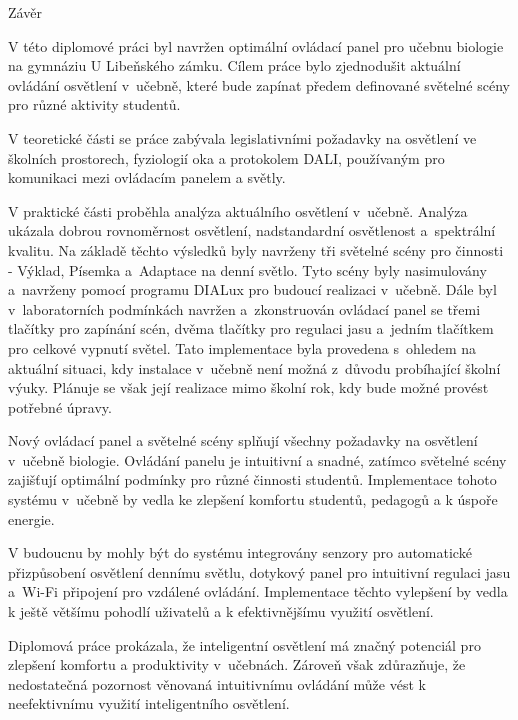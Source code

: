 \nonum\chap Závěr

V této diplomové práci byl navržen optimální ovládací panel pro učebnu
biologie na gymnáziu U Libeňského zámku.
Cílem práce bylo zjednodušit aktuální ovládání osvětlení v~učebně, které bude zapínat předem definované světelné scény pro různé aktivity studentů.


V teoretické části se práce zabývala legislativními požadavky na osvětlení ve školních prostorech,
fyziologií oka a protokolem DALI, používaným pro komunikaci mezi ovládacím panelem a světly.


V praktické části proběhla analýza aktuálního osvětlení v~učebně.
Analýza ukázala dobrou rovnoměrnost osvětlení, nadstandardní osvětlenost a~spektrální kvalitu.
Na základě těchto výsledků byly navrženy tři světelné scény pro činnosti -
Výklad, Písemka a~Adaptace na denní světlo.
Tyto scény byly nasimulovány a~navrženy pomocí programu DIALux pro budoucí realizaci v~učebně.
Dále byl v~laboratorních podmínkách navržen a~zkonstruován ovládací panel se třemi tlačítky pro zapínání scén,
dvěma tlačítky pro regulaci jasu a~jedním tlačítkem pro celkové vypnutí světel.
Tato implementace byla provedena s~ohledem na aktuální situaci, kdy instalace v~učebně není možná
z~důvodu probíhající školní výuky. Plánuje se však její realizace mimo školní rok, kdy bude možné provést potřebné úpravy.

Nový ovládací panel a světelné scény splňují všechny požadavky na osvětlení v~učebně biologie.
Ovládání panelu je intuitivní a snadné, zatímco světelné scény zajišťují optimální podmínky pro různé činnosti studentů.
Implementace tohoto systému v~učebně by vedla ke zlepšení komfortu studentů, pedagogů a k úspoře energie.

V budoucnu by mohly být do systému integrovány senzory pro automatické přizpůsobení
osvětlení dennímu světlu, dotykový panel pro intuitivní regulaci jasu a~Wi-Fi připojení pro vzdálené ovládání.
Implementace těchto vylepšení by vedla k ještě většímu pohodlí uživatelů a k efektivnějšímu využití osvětlení.

Diplomová práce prokázala, že inteligentní osvětlení má značný potenciál
pro zlepšení komfortu a produktivity v~učebnách.
Zároveň však zdůrazňuje, že nedostatečná pozornost věnovaná
intuitivnímu ovládání může vést k neefektivnímu využití inteligentního osvětlení.








